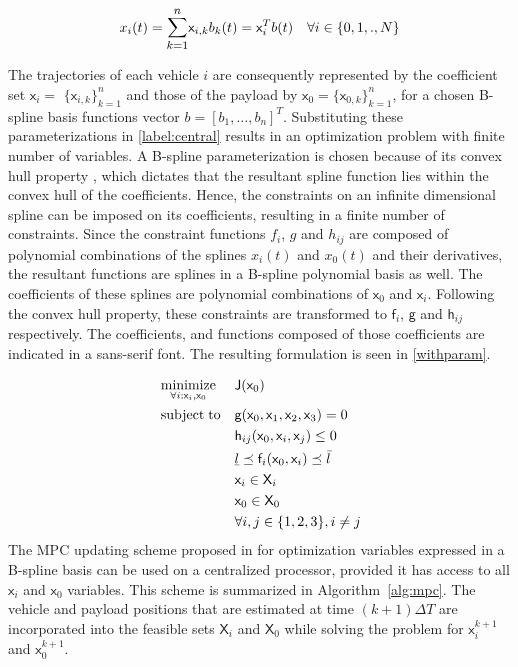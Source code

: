 \documentclass[letterpaper, 10 pt, conference]{ieeeconf}
\newcommand{\ubar}[1]{\text{\b{$#1$}}}
\DeclareMathOperator*{\minimize}{minimize}
\DeclareMathOperator*{\subj}{subject\;to}
\newcommand{\cx}{\textsf{x}}
\newcommand{\J}{\textsf{J}}
\newcommand{\cf}{\textsf{f}}
\newcommand{\cg}{\textsf{g}}
\newcommand{\ch}{\textsf{h}}
\newcommand{\X}{\textsf{X}}
\begin{document}
\begin{equation}\label{spline}
x_i(t) = \mathlarger{\sum\limits_{k=1}^{n}} \cx_{i,k}b_k(t) = \cx_i^Tb(t) \quad \forall i \in \{0,1,.,N\}
\end{equation}

 The trajectories of each vehicle $i$ are consequently represented by the coefficient set $\cx_i$$=$ $\{\cx_{i,k}\}_{k=1}^{n}$ and those of the payload by $\cx_0$$=$$\{\cx_{0,k}\}_{k=1}^{n}$, for a chosen B-spline basis functions vector $b = [b_1,\ldots,b_n]^T$. Substituting these parameterizations in \eqref{label:central} results in an optimization problem with finite number of variables. A B-spline parameterization is chosen because of its convex hull property \cite{c15}, which dictates that the resultant spline function lies within the convex hull of the coefficients. Hence, the constraints on an infinite dimensional spline can be imposed on its coefficients, resulting in a finite number of constraints. Since the constraint functions $f_i$, $g$ and $h_{ij}$ are composed of polynomial combinations of the splines $x_i(t)$ and $x_0(t)$ and their derivatives, the resultant functions are splines in a B-spline polynomial basis as well. The coefficients of these splines are polynomial combinations of $\cx_0$ and $\cx_i$. Following the convex hull property, these constraints are transformed to $\cf_i$, $\cg$ and $\ch_{ij}$ respectively. The coefficients, and functions composed of those coefficients are indicated in a sans-serif font.
The resulting formulation is seen in \eqref{withparam}.

 \begin{equation}
   \label{withparam}
   \begin{aligned}
     & \minimize_{\forall i:\cx_i,\cx_0} &&  \J(\cx_0) \\
     & \subj
     &      & \cg(\cx_0,\cx_1,\cx_2,\cx_3) = 0 \\
     &        && \ch_{ij}(\cx_0,\cx_i,\cx_j) \leq 0 \\
     &	&& \ubar{l} \preceq \cf_i(\cx_0,\cx_i) \preceq \bar{l}\\
     &        && \cx_i \in \X_i \\
     &        && \cx_0 \in \X_0 \\
     &                                && \forall i,j \in \{1,2,3\}, i \neq j
   \end{aligned}
 \end{equation}
 The MPC updating scheme proposed in \cite{c16} for optimization variables expressed in a B-spline basis can be used on a centralized processor, provided it has access to all $\cx_i$ and $\cx_0$ variables. This scheme is summarized in Algorithm~\ref{alg:mpc}. The vehicle and payload positions that are estimated at time $(k+1)\Delta T$ are incorporated into the feasible sets $\X_i$ and $\X_0$ while solving the problem for $\cx_i^{k+1}$ and $\cx_0^{k+1}$.
\end{document}
